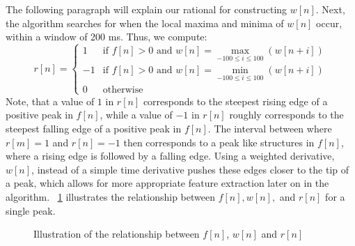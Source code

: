 \documentclass[conference]{IEEEtran}
\begin{document}
The following paragraph will explain our rational for constructing $w[n]$. Next, the algorithm 
searches for when the local
maxima and minima of $w[n]$ occur, within a window of
200 ms. Thus, we compute:
\begin{equation*}
	r[n] = \left \{
		\begin{array}{lc}
			1 & \text{if } f[n]>0 \text{ and } w[n] = \max\limits_{-100 \le i \le 100} (w[n+i]) \\
			-1 & \text{if } f[n]>0 \text{ and }  w[n] = \min\limits_{-100 \le i \le 100} (w[n+i]) \\
			0 & \text{otherwise}
		\end{array}
	\right.
\end{equation*}
Note, that a value of $1$ in $r[n]$ corresponds to the
steepest rising edge of a positive peak in $f[n]$, while a value of $-1$
in $r[n]$ roughly corresponds to the steepest falling edge of a positive peak
in $f[n]$. 
The interval between where $r[m]=1$ and $r[n]=-1$ then corresponds to a 
peak like structures in $f[n]$, where a rising edge is followed by a falling edge.
Using a weighted derivative, $w[n]$, instead of a simple time derivative pushes these edges closer to the tip of a peak,
 which allows for more appropriate feature extraction later on in the algorithm.
\figurename~\ref{fig:fwr} illustrates the relationship between $f[n], w[n], $ and $r[n]$ for a single peak.
\begin{figure}
	\centering
	\caption{
	Illustration of the relationship between $f[n]$, $w[n]$ and $r[n]$}
	\label{fig:fwr}
\end{figure}
\end{document}
